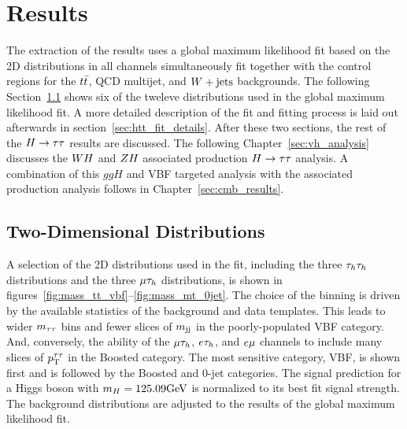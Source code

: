 
\section{Results}

The extraction of the results uses a global maximum likelihood fit based on the 2D distributions in all 
channels simultaneously fit together with the control regions for the $t\bar{t}$, QCD multijet, and $W +\text{jets}$ backgrounds. 
The following Section~\ref{sec:htt_2d} shows six of the tweleve distributions used in the
global maximum likelihood fit. A more detailed description of the fit and fitting process is 
laid out afterwards in section~\ref{sec:htt_fit_details}. After these two sections,
the rest of the $H\to\tau\tau$ results are discussed.
The following Chapter~\ref{sec:vh_analysis} discusses the $WH$ and $ZH$ associated production $H\to\tau\tau$ analysis.
A combination of this $ggH$ and VBF targeted analysis with the associated production analysis
follows in Chapter~\ref{sec:cmb_results}.


\subsection{Two-Dimensional Distributions}
\label{sec:htt_2d}
A selection of the 2D distributions used in the fit, including the three $\tau_{h}\tau_{h}$ distributions and
the three $\mu\tau_{h}$ distributions, is shown in figures~\ref{fig:mass_tt_vbf}--\ref{fig:mass_mt_0jet}.
The choice of the binning is driven by the available statistics of the background and data templates. This leads to wider 
$m_{\tau\tau}$ bins and fewer slices of $m_\mathrm{jj}$ in the poorly-populated VBF category. And, conversely, the ability of the $\mu\tau_{h}$,
$e\tau_{h}$, and $e\mu$ channels to include many slices of $p_\mathrm{T}^{\tau\tau}$ in the Boosted category. 
The most sensitive category, VBF, is shown first and is followed by the Boosted and 0-jet categories.
The signal prediction for a Higgs boson with $m_{H} = 125.09\mathrm{GeV}$ is normalized to its best fit signal strength.
The background distributions are adjusted to the results of the global maximum likelihood fit.

